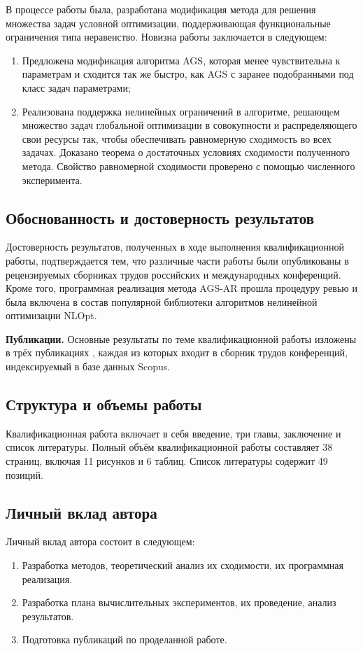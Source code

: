 В процессе работы была, разработана модификация метода для решения множества задач условной оптимизации, поддерживающая
функциональные ограничения типа неравенство.
Новизна работы заключается в следующем:

\begin{enumerate}
    \item Предложена модификация алгоритма AGS, которая менее чувствительна к параметрам и сходится так же быстро, как AGS
    с заранее подобранными под класс задач параметрами;
    \item Реализована поддержка нелинейных ограничений в алгоритме, решающeм
    множество задач глобальной оптимизации в совокупности и распределяющего свои ресурсы так, чтобы
    обеспечивать равномерную сходимость во всех задачах. Доказано теорема о достаточных условиях сходимости
    полученного метода. Свойство равномерной сходимости проверено с помощью численного эксперимента.
\end{enumerate}

\subsection*{Обоснованность и достоверность результатов}
Достоверность результатов, полученных в ходе выполнения квалификационной работы, подтверждается
тем, что различные части работы были опубликованы в рецензируемых сборниках трудов российских и международных конференций.
Кроме того, программная реализация метода AGS-AR прошла процедуру ревью и была включена в состав популярной библиотеки
алгоритмов нелинейной оптимизации NLOpt.

\textbf{Публикации.} Основные результаты по теме квалификационной работы изложены в трёх публикациях \cite{barkalovSovraov2019,sovrasov2019,sovrasov2020},
каждая из которых входит в сборник трудов конференций, индексируемый в базе данных Scopus.

\subsection*{Структура и объемы работы}

Квалификационная работа включает в себя введение, три главы, заключение и список литературы.
Полный объём квалификационной работы составляет 38 страниц, включая 11 рисунков и 6 таблиц.
Список литературы содержит 49 позиций.

\subsection*{Личный вклад автора}

Личный вклад автора состоит в следующем:

\begin{enumerate}
    \item Разработка методов, теоретический анализ их сходимости, их программная реализация.
    \item Разработка плана вычислительных экспериментов, их проведение, анализ результатов.
    \item Подготовка публикаций по проделанной работе.
\end{enumerate}
